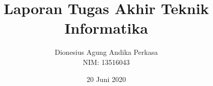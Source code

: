 \documentclass[12pt, a4paper, onecolumn, oneside, final]{report}
\begin{document}
\title{Laporan Tugas Akhir Teknik Informatika}
\date{20 Juni 2020}
\author{
	Dionesius Agung Andika Perkasa \\
	NIM: 13516043
}

\setcounter{page}{0}



%    


\pagestyle{plain}





\renewcommand*\contentsname{DAFTAR ISI}
\renewcommand*\appendixtocname{DAFTAR LAMPIRAN}
\renewcommand*\listfigurename{DAFTAR GAMBAR}
\renewcommand*\listtablename{DAFTAR TABEL}
\renewcommand*\bibname{DAFTAR PUSTAKA}

\tableofcontents
\listofappendices
{%
	\let\oldnumberline\numberline%
	\renewcommand{\numberline}{\figurename~\oldnumberline}%
	\listoffigures%
}
{%
	\let\oldnumberline\numberline%
	\renewcommand{\numberline}{\tablename~\oldnumberline}%
	\listoftables%
}


\renewcommand{\chaptername}{BAB}
\renewcommand{\thechapter}{\Roman{chapter}}







\begingroup
\renewcommand{\baselinestretch}{1.0}
\printbibliography[heading=bibintoc]
\endgroup
\end{document}
